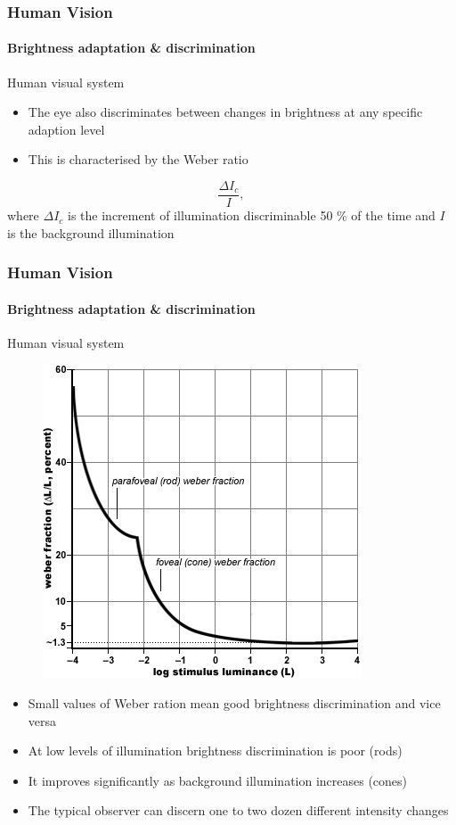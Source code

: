 \documentclass[table]{beamer}
\begin{document}
\begin{frame}
  \frametitle{Human Vision}
  \framesubtitle{Brightness adaptation \& discrimination}
  \begin{block}{Human visual system}
    \begin{itemize}\scriptsize
    \item The eye also discriminates between changes in brightness at any specific adaption level
    \item This is characterised by the Weber ratio
    \end{itemize}
    \begin{equation}
      \frac{\Delta I_c}{I},
    \end{equation}
    {\scriptsize where $\Delta I_c$ is the increment of illumination discriminable 50 \% of the time and $I$ is the background illumination}
  \end{block}
\end{frame}

\begin{frame}
  \frametitle{Human Vision}
  \framesubtitle{Brightness adaptation \& discrimination}
  \begin{block}{Human visual system}
    \begin{figure}
      \centering
      \includegraphics[height=.35\textheight]{./images/wr.png}
    \end{figure}
    \begin{itemize}\scriptsize
    \item Small values of Weber ration mean good brightness discrimination and vice versa
    \item At low levels of illumination brightness discrimination is poor (rods)
    \item It improves significantly as background illumination increases (cones)
    \item The typical observer can discern one to two dozen different intensity changes
    \end{itemize}
  \end{block}
\end{frame}
\end{document}
